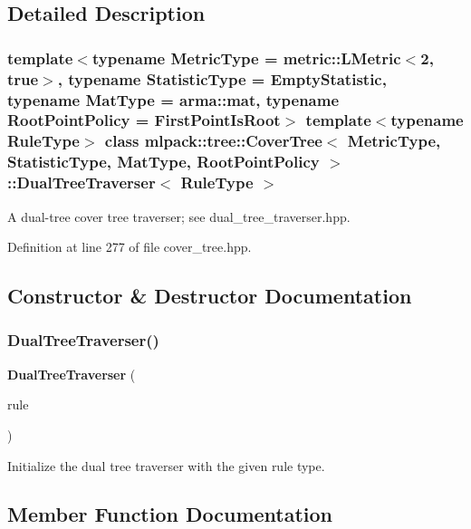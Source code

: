 \subsection{Detailed Description}
\subsubsection*{template$<$typename Metric\+Type = metric\+::\+L\+Metric$<$2, true$>$, typename Statistic\+Type = Empty\+Statistic, typename Mat\+Type = arma\+::mat, typename Root\+Point\+Policy = First\+Point\+Is\+Root$>$\newline
template$<$typename Rule\+Type$>$\newline
class mlpack\+::tree\+::\+Cover\+Tree$<$ Metric\+Type, Statistic\+Type, Mat\+Type, Root\+Point\+Policy $>$\+::\+Dual\+Tree\+Traverser$<$ Rule\+Type $>$}

A dual-\/tree cover tree traverser; see dual\+\_\+tree\+\_\+traverser.\+hpp. 

Definition at line 277 of file cover\+\_\+tree.\+hpp.



\subsection{Constructor \& Destructor Documentation}
\mbox{\label{classmlpack_1_1tree_1_1CoverTree_1_1DualTreeTraverser_abd4227fd4d7e7f3e1090233443cc265e}} 
\subsubsection{Dual\+Tree\+Traverser()}
{\footnotesize\ttfamily \textbf{ Dual\+Tree\+Traverser} (\begin{DoxyParamCaption}\item[{Rule\+Type \&}]{rule }\end{DoxyParamCaption})}



Initialize the dual tree traverser with the given rule type. 



\subsection{Member Function Documentation}
\mbox{\label{classmlpack_1_1tree_1_1CoverTree_1_1DualTreeTraverser_afc2a1471e0354570c99c25473d32433e}} 
